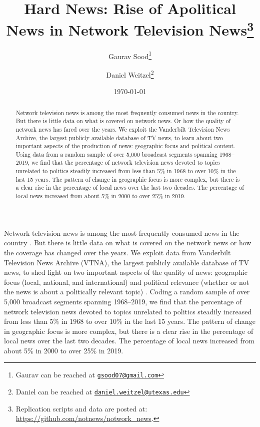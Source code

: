 \documentclass[12pt, letterpaper]{article}
\title{\Large{Hard News: Rise of Apolitical News in Network Television News}\footnote{Replication scripts and data are posted at: \url{https://github.com/notnews/notwork_news}.}}
\author{Gaurav Sood\thanks{Gaurav can be reached at \href{mailto:gsood07@gmail.com}{\footnotesize{\texttt{gsood07@gmail.com}}}}
\and Daniel Weitzel\thanks{Daniel can be reached at \href{mailto:daniel.weitzel@utexas.edu}{\footnotesize{\texttt{daniel.weitzel@utexas.edu}}}}}
\date{\vspace{.5cm}\normalsize{\today}}
\begin{document}
\maketitle

\begin{abstract}
Network television news is among the most frequently consumed news in the country. But there is little data on what is covered on network news. Or how the quality of network news has fared over the years. We exploit the Vanderbilt Television News Archive, the largest publicly available database of TV news, to learn about two important aspects of the production of news: geographic focus and political content. Using data from a random sample of over 5,000 broadcast segments spanning 1968--2019, we find that the percentage of network television news devoted to topics unrelated to politics steadily increased from less than 5\% in 1968 to over 10\% in the last 15 years. The pattern of change in geographic focus is more complex, but there is a clear rise in the percentage of local news over the last two decades. The percentage of local news increased from about 5\% in 2000 to over 25\% in 2019.
\end{abstract}

\clearpage
\doublespacing
Network television news is among the most frequently consumed news in the country \citep{pew2019, pew2020}. But there is little data on what is covered on the network news or how the coverage has changed over the years. We exploit data from Vanderbilt Television News Archive (VTNA), the largest publicly available database of TV news, to shed light on two important aspects of the quality of news: geographic focus (local, national, and international) and political relevance (whether or not the news is about a politically relevant topic) \citep{curran2009media}. Coding a random sample of over 5,000 broadcast segments spanning 1968--2019, we find that the percentage of network television news devoted to topics unrelated to politics steadily increased from less than 5\% in 1968 to over 10\% in the last 15 years. The pattern of change in geographic focus is more complex, but there is a clear rise in the percentage of local news over the last two decades. The percentage of local news increased from about 5\% in 2000 to over 25\% in 2019.
\end{document}
